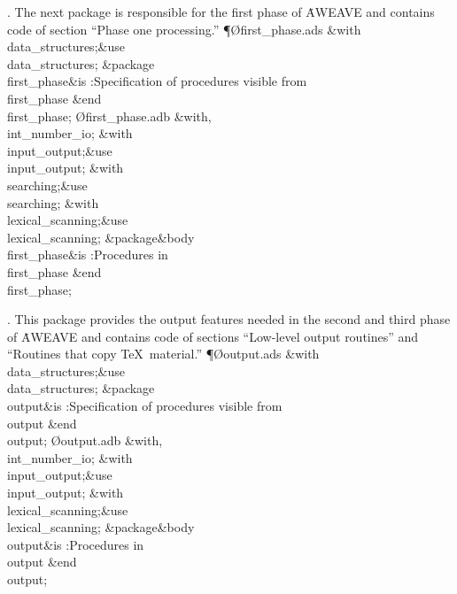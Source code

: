 \*. The next package is responsible for the first phase of \.{AWEAVE} and
contains code of section ``Phase one processing.''
\Y\P\O{first\_phase.ads}\?\6
\?\&{with}\8\\{data\_structures};\8\&{use}\8\\{data\_structures};\6
\&{package}\8\1\\{first\_phase}\2\8\&{is}\8\1\6
:Specification of procedures visible from \\{first\_phase}\X\2\6
\&{end}\8\\{first\_phase};\7
\O{first\_phase.adb}\?\6
\?\&{with}\8\?,\?\\{int\_number\_io};\6
\&{with}\8\\{input\_output};\8\&{use}\8\\{input\_output};\6
\&{with}\8\\{searching};\8\&{use}\8\\{searching};\6
\&{with}\8\\{lexical\_scanning};\8\&{use}\8\\{lexical\_scanning};\6
\&{package}\8\1\&{body}\8\\{first\_phase}\2\8\&{is}\8\1\6
:Procedures in \\{first\_phase}\X\2\6
\&{end}\8\\{first\_phase};\par
\fi

\*. This package provides the output features needed in the second and
third phase of \.{AWEAVE} and contains code of sections ``Low-level
output routines'' and ``Routines that copy \TeX\ material.''
\Y\P\O{output.ads}\?\6
\?\&{with}\8\\{data\_structures};\8\&{use}\8\\{data\_structures};\6
\&{package}\8\1\\{output}\2\8\&{is}\8\1\6
:Specification of procedures visible from \\{output}\X\2\6
\&{end}\8\\{output};\7
\O{output.adb}\?\6
\?\&{with}\8\?,\?\\{int\_number\_io};\6
\&{with}\8\\{input\_output};\8\&{use}\8\\{input\_output};\6
\&{with}\8\\{lexical\_scanning};\8\&{use}\8\\{lexical\_scanning};\6
\&{package}\8\1\&{body}\8\\{output}\2\8\&{is}\8\1\6
:Procedures in \\{output}\X\2\6
\&{end}\8\\{output};\par
\fi

